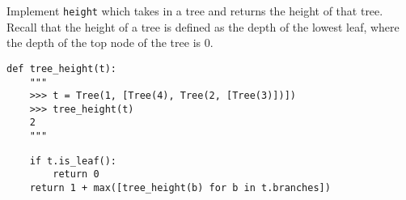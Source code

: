 \begin{blocksection}
\question Implement \lstinline$height$ which takes in a 
tree and returns the height of that tree. Recall that the
height of a tree is defined as the depth of the lowest leaf,
where the depth of the top node of the tree is 0.

\begin{lstlisting}
def tree_height(t):
    """
    >>> t = Tree(1, [Tree(4), Tree(2, [Tree(3)])])
    >>> tree_height(t)
    2
    """
\end{lstlisting}

\begin{solution}[2in]
\begin{lstlisting}
    if t.is_leaf():
        return 0
    return 1 + max([tree_height(b) for b in t.branches])
\end{lstlisting}
\end{solution}
\end{blocksection}
